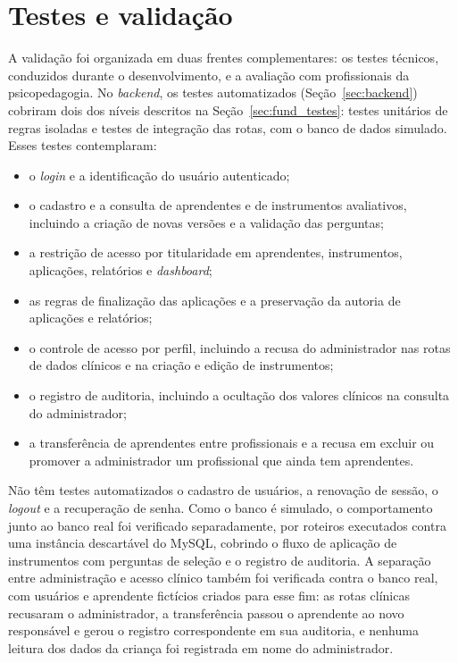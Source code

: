 \section{Testes e validação}\label{sec:testes-validacao}

A validação foi organizada em duas frentes complementares: os testes técnicos, conduzidos durante o desenvolvimento, e a avaliação com profissionais da psicopedagogia. No \textit{backend}, os testes automatizados (Seção~\ref{sec:backend}) cobriram dois dos níveis descritos na Seção~\ref{sec:fund_testes}: testes unitários de regras isoladas e testes de integração das rotas, com o banco de dados simulado. Esses testes contemplaram:

\begin{itemize}
    \item o \textit{login} e a identificação do usuário autenticado;
    \item o cadastro e a consulta de aprendentes e de instrumentos avaliativos, incluindo a criação de novas versões e a validação das perguntas;
    \item a restrição de acesso por titularidade em aprendentes, instrumentos, aplicações, relatórios e \textit{dashboard};
    \item as regras de finalização das aplicações e a preservação da autoria de aplicações e relatórios;
    \item o controle de acesso por perfil, incluindo a recusa do administrador nas rotas de dados clínicos e na criação e edição de instrumentos;
    \item o registro de auditoria, incluindo a ocultação dos valores clínicos na consulta do administrador;
    \item a transferência de aprendentes entre profissionais e a recusa em excluir ou promover a administrador um profissional que ainda tem aprendentes.
\end{itemize}

Não têm testes automatizados o cadastro de usuários, a renovação de sessão, o \textit{logout} e a recuperação de senha. Como o banco é simulado, o comportamento junto ao banco real foi verificado separadamente, por roteiros executados contra uma instância descartável do MySQL, cobrindo o fluxo de aplicação de instrumentos com perguntas de seleção e o registro de auditoria. A separação entre administração e acesso clínico também foi verificada contra o banco real, com usuários e aprendente fictícios criados para esse fim: as rotas clínicas recusaram o administrador, a transferência passou o aprendente ao novo responsável e gerou o registro correspondente em sua auditoria, e nenhuma leitura dos dados da criança foi registrada em nome do administrador.

